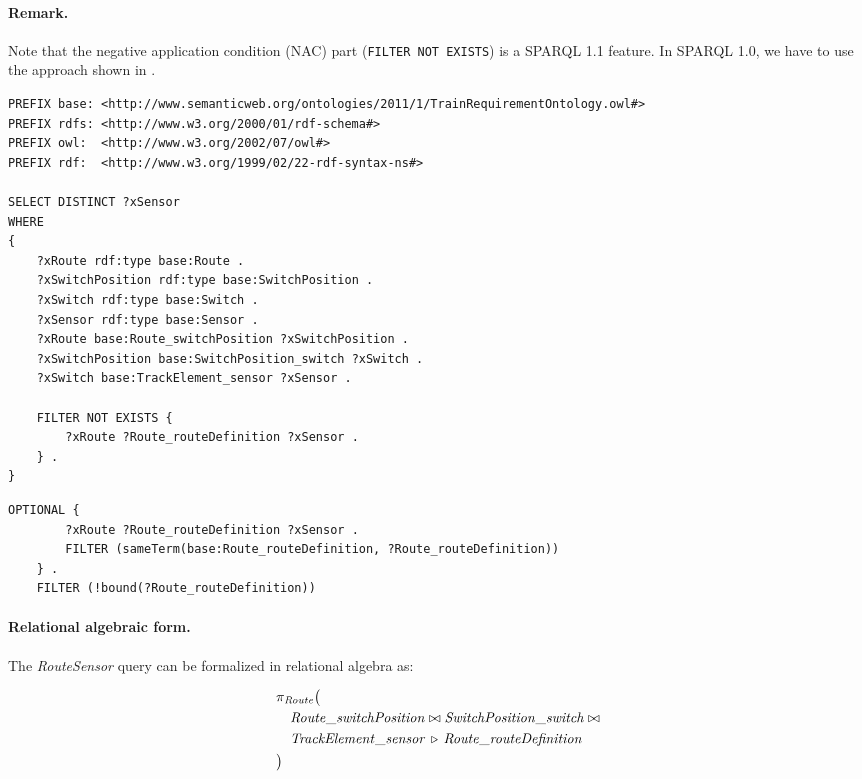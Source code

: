 \paragraph{Remark.} Note that the negative application condition (NAC) part (\texttt{FILTER NOT EXISTS}) is a SPARQL 1.1 feature. In SPARQL 1.0, we have to use the approach shown in .

\begin{lstlisting}[caption=The RouteSensor query in SPARQL, label=lst:routesensor-sparql]
PREFIX base: <http://www.semanticweb.org/ontologies/2011/1/TrainRequirementOntology.owl#>
PREFIX rdfs: <http://www.w3.org/2000/01/rdf-schema#>
PREFIX owl:  <http://www.w3.org/2002/07/owl#>
PREFIX rdf:  <http://www.w3.org/1999/02/22-rdf-syntax-ns#>

SELECT DISTINCT ?xSensor
WHERE
{
    ?xRoute rdf:type base:Route .
    ?xSwitchPosition rdf:type base:SwitchPosition .
    ?xSwitch rdf:type base:Switch .
    ?xSensor rdf:type base:Sensor .
    ?xRoute base:Route_switchPosition ?xSwitchPosition .
    ?xSwitchPosition base:SwitchPosition_switch ?xSwitch .
    ?xSwitch base:TrackElement_sensor ?xSensor .

    FILTER NOT EXISTS {
        ?xRoute ?Route_routeDefinition ?xSensor .
    } .
}
\end{lstlisting}

\begin{lstlisting}[caption=SPARQL 1.0 formula for the NAC part of the RouteSensor query, label=lst:routesensor-sparql-nac]
    OPTIONAL {
        ?xRoute ?Route_routeDefinition ?xSensor .
        FILTER (sameTerm(base:Route_routeDefinition, ?Route_routeDefinition))
    } .
    FILTER (!bound(?Route_routeDefinition))
\end{lstlisting}


\paragraph{Relational algebraic form.}  The \textit{RouteSensor} query can be formalized in relational algebra as:

\begin{align*}
& \pi_{\mathit{Route}} \big( \\
& \quad \mathit{Route\_switchPosition} \bowtie \mathit{SwitchPosition\_switch} \bowtie \\
& \quad \mathit{TrackElement\_sensor} \, \triangleright \, \mathit{Route\_routeDefinition} \\
& \big)
\end{align*}

